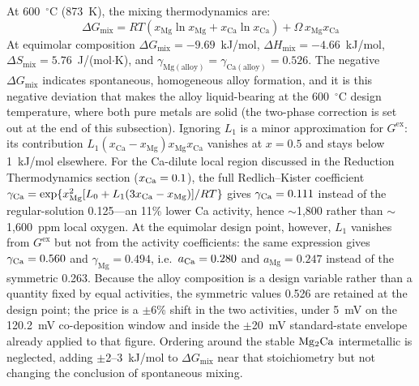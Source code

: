 \documentclass[pdflatex,sn-basic,Numbered]{sn-jnl}
\begin{document}
At 600~$^{\circ}$C (873~K), the mixing thermodynamics are:
\begin{equation}
\label{eq:mix}
\Delta G_{\mathrm{mix}} = RT(x_{\mathrm{Mg}}\ln x_{\mathrm{Mg}} + x_{\mathrm{Ca}}\ln x_{\mathrm{Ca}}) + \Omega\,x_{\mathrm{Mg}}x_{\mathrm{Ca}}
\end{equation}
At equimolar composition $\Delta G_{\mathrm{mix}} = -9.69$~kJ/mol, $\Delta H_{\mathrm{mix}} = -4.66$~kJ/mol, $\Delta S_{\mathrm{mix}} = 5.76$~J/(mol$\cdot$K), and $\gamma_{\mathrm{Mg(alloy)}} = \gamma_{\mathrm{Ca(alloy)}} = 0.526$. The negative $\Delta G_{\mathrm{mix}}$ indicates spontaneous, homogeneous alloy formation, and it is this negative deviation that makes the alloy liquid-bearing at the 600~$^{\circ}$C design temperature, where both pure metals are solid (the two-phase correction is set out at the end of this subsection). Ignoring $L_1$ is a minor approximation for $G^{\mathrm{ex}}$: its contribution $L_1(x_{\mathrm{Ca}}-x_{\mathrm{Mg}})x_{\mathrm{Mg}}x_{\mathrm{Ca}}$ vanishes at $x = 0.5$ and stays below 1~kJ/mol elsewhere. For the Ca-dilute local region discussed in the Reduction Thermodynamics section ($x_{\ce{Ca}} = 0.1$), the full Redlich--Kister coefficient $\gamma_{\ce{Ca}} = \exp\{x_{\ce{Mg}}^2[L_0 + L_1(3x_{\ce{Ca}}-x_{\ce{Mg}})]/RT\}$ gives $\gamma_{\ce{Ca}} = 0.111$ instead of the regular-solution 0.125---an 11\% lower Ca activity, hence $\sim$1{,}800 rather than $\sim$1{,}600~ppm local oxygen. At the equimolar design point, however, $L_1$ vanishes from $G^{\mathrm{ex}}$ but not from the activity coefficients: the same expression gives $\gamma_{\ce{Ca}} = 0.560$ and $\gamma_{\mathrm{Mg}} = 0.494$, i.e.\ $a_{\ce{Ca}} = 0.280$ and $a_{\mathrm{Mg}} = 0.247$ instead of the symmetric 0.263. Because the alloy composition is a design variable rather than a quantity fixed by equal activities, the symmetric values 0.526 are retained at the design point; the price is a $\pm$6\% shift in the two activities, under 5~mV on the 120.2~mV co-deposition window and inside the $\pm$20~mV standard-state envelope already applied to that figure. Ordering around the stable $\ce{Mg2Ca}$ intermetallic is neglected, adding $\pm$2--3~kJ/mol to $\Delta G_{\mathrm{mix}}$ near that stoichiometry but not changing the conclusion of spontaneous mixing.
\end{document}
